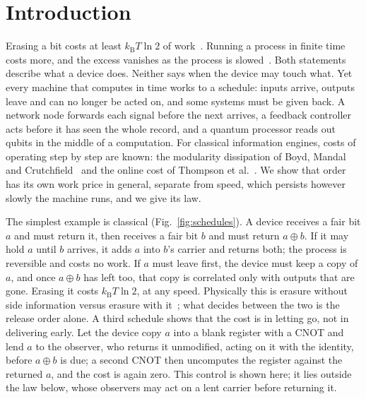 \documentclass[11pt]{article}
\newcommand{\kB}{k_{\mathrm B}}
\begin{document}
\section*{Introduction}
Erasing a bit costs at least $\kB T\ln2$ of work~\cite{Landauer61}. Running a process in finite time costs more, and the excess vanishes as the process is slowed~\cite{SalamonBerry83,Crooks07,ScandiPerarnauLlobet19}. Both statements describe what a device does. Neither says when the device may touch what. Yet every machine that computes in time works to a schedule: inputs arrive, outputs leave and can no longer be acted on, and some systems must be given back. A network node forwards each signal before the next arrives, a feedback controller acts before it has seen the whole record, and a quantum processor reads out qubits in the middle of a computation. For classical information engines, costs of operating step by step are known: the modularity dissipation of Boyd, Mandal and Crutchfield~\cite{BMC18} and the online cost of Thompson et al.~\cite{Thompson25}. We show that order has its own work price in general, separate from speed, which persists however slowly the machine runs, and we give its law.

The simplest example is classical (Fig.~\ref{fig:schedules}). A device receives a fair bit $a$ and must return it, then receives a fair bit $b$ and must return $a\oplus b$. If it may hold $a$ until $b$ arrives, it adds $a$ into $b$'s carrier and returns both; the process is reversible and costs no work. If $a$ must leave first, the device must keep a copy of $a$, and once $a\oplus b$ has left too, that copy is correlated only with outputs that are gone. Erasing it costs $\kB T\ln2$, at any speed. Physically this is erasure without side information versus erasure with it~\cite{Bennett82,delRio11}; what decides between the two is the release order alone. A third schedule shows that the cost is in letting go, not in delivering early. Let the device copy $a$ into a blank register with a CNOT and lend $a$ to the observer, who returns it unmodified, acting on it with the identity, before $a\oplus b$ is due; a second CNOT then uncomputes the register against the returned $a$, and the cost is again zero. This control is shown here; it lies outside the law below, whose observers may act on a lent carrier before returning it.
\end{document}
